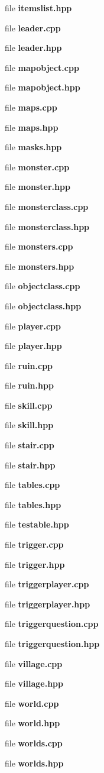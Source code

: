 \begin{CompactItemize}
file {\bf itemslist.hpp}
\item 
file {\bf leader.cpp}
\item 
file {\bf leader.hpp}
\item 
file {\bf mapobject.cpp}
\item 
file {\bf mapobject.hpp}
\item 
file {\bf maps.cpp}
\item 
file {\bf maps.hpp}
\item 
file {\bf masks.hpp}
\item 
file {\bf monster.cpp}
\item 
file {\bf monster.hpp}
\item 
file {\bf monsterclass.cpp}
\item 
file {\bf monsterclass.hpp}
\item 
file {\bf monsters.cpp}
\item 
file {\bf monsters.hpp}
\item 
file {\bf objectclass.cpp}
\item 
file {\bf objectclass.hpp}
\item 
file {\bf player.cpp}
\item 
file {\bf player.hpp}
\item 
file {\bf ruin.cpp}
\item 
file {\bf ruin.hpp}
\item 
file {\bf skill.cpp}
\item 
file {\bf skill.hpp}
\item 
file {\bf stair.cpp}
\item 
file {\bf stair.hpp}
\item 
file {\bf tables.cpp}
\item 
file {\bf tables.hpp}
\item 
file {\bf testable.hpp}
\item 
file {\bf trigger.cpp}
\item 
file {\bf trigger.hpp}
\item 
file {\bf triggerplayer.cpp}
\item 
file {\bf triggerplayer.hpp}
\item 
file {\bf triggerquestion.cpp}
\item 
file {\bf triggerquestion.hpp}
\item 
file {\bf village.cpp}
\item 
file {\bf village.hpp}
\item 
file {\bf world.cpp}
\item 
file {\bf world.hpp}
\item 
file {\bf worlds.cpp}
\item 
file {\bf worlds.hpp}
\end{CompactItemize}
